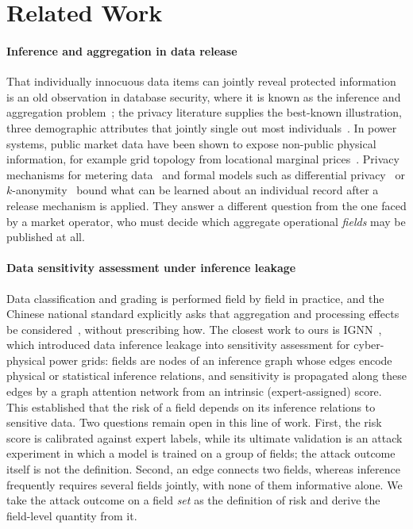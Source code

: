 \section{Related Work}\label{sec:related}

\paragraph{Inference and aggregation in data release}
That individually innocuous data items can jointly reveal protected information is an old
observation in database security, where it is known as the inference and aggregation
problem~\cite{lunt1989aggregation,farkas2002inference}; the privacy literature supplies the
best-known illustration, three demographic attributes that jointly single out most
individuals~\cite{sweeney2000simple}. In power systems, public market data have been shown to
expose non-public physical information, for example grid topology from locational marginal
prices~\cite{kekatos2014topology}. Privacy mechanisms for metering data~\cite{mcdaniel2009smartgrid,giaconi2018smartmeter}
and formal models such as differential privacy~\cite{dwork2014dp} or
$k$-anonymity~\cite{sweeney2002kanonymity} bound what can be learned about an individual
record after a release mechanism is applied. They answer a different question from the one
faced by a market operator, who must decide which aggregate operational \emph{fields} may be
published at all.

\paragraph{Data sensitivity assessment under inference leakage}
Data classification and grading is performed field by field in practice, and the Chinese
national standard explicitly asks that aggregation and processing effects be
considered~\cite{gbt43697}, without prescribing how. The closest work to ours is IGNN~\cite{hu2026ignn},
which introduced data inference leakage into sensitivity assessment for cyber-physical power
grids: fields are nodes of an inference graph whose edges encode physical or statistical
inference relations, and sensitivity is propagated along these edges by a graph attention
network from an intrinsic (expert-assigned) score. This established that the risk of a field
depends on its inference relations to sensitive data. Two questions remain open in this line
of work. First, the risk score is calibrated against expert labels, while its ultimate
validation is an attack experiment in which a model is trained on a group of fields; the
attack outcome itself is not the definition. Second, an edge connects two fields, whereas
inference frequently requires several fields jointly, with none of them informative alone.
We take the attack outcome on a field \emph{set} as the definition of risk and derive the
field-level quantity from it.


